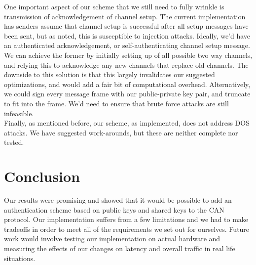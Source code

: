 \documentclass{article}
\begin{document}
    One important aspect of our scheme that we still need to fully wrinkle is transmission of acknowledgement of channel setup. The current implementation has senders assume that channel setup is successful after all setup messages have been sent, but as noted, this is susceptible to injection attacks. Ideally, we'd have an authenticated acknowledgement, or self-authenticating channel setup message. We can achieve the former by initially setting up of all possible two way channels, and relying this to acknowledge any new channels that replace old channels. The downside to this solution is that this largely invalidates our suggested optimizations, and would add a fair bit of computational overhead. Alternatively, we could sign every message frame with our public-private key pair, and truncate to fit into the frame. We'd need to ensure that brute force attacks are still infeasible.\\
    
    Finally, as mentioned before, our scheme, as implemented, does not address DOS attacks. We have suggested work-arounds, but these are neither complete nor tested.

\section{Conclusion}
  Our results were promising and showed that it would be possible to add an authentication scheme based on public keys and shared keys to the CAN protocol. Our implementation suffers from a few limitations and we had to make tradeoffs in order to meet all of the requirements we set out for ourselves. Future work would involve testing our implementation on actual hardware and measuring the effects of our changes on latency and overall traffic in real life situations.




\appendix
\end{document}
